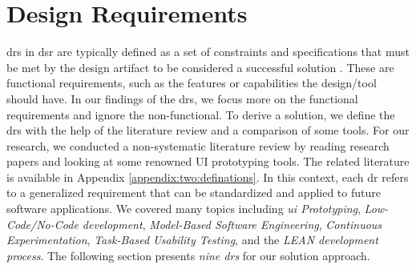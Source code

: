 \section{Design Requirements}
\label{design:section:designReqs}
\ac{dr}s in \ac{dsr} are typically defined as a set of constraints and specifications that must be met by the design artifact to be considered a successful solution \cite{misc:dsr:henver}. 
These are functional requirements, such as the features or capabilities the design/tool should have.
In our findings of the \ac{dr}s, we focus more on the functional requirements and ignore the non-functional.
To derive a solution, we define the \ac{dr}s with the help of the literature review and a comparison of some tools.
For our research, we conducted a non-systematic literature review by reading research papers and looking at some renowned UI prototyping tools. 
The related literature is available in Appendix \ref{appendix:two:definations}.
In this context, each \ac{dr} refers to a generalized requirement that can be standardized and applied to future software applications.
We covered many topics including \textit{\ac{ui} Prototyping}, \textit{Low-Code/No-Code development}, \textit{Model-Based Software Engineering}, \textit{Continuous Experimentation}, \textit{Task-Based Usability Testing}, and the \textit{LEAN development process}.
The following section presents \textit{nine \ac{dr}s} for our solution approach.
